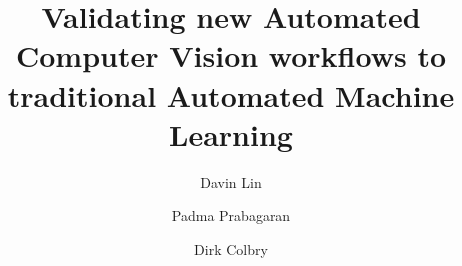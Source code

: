 \documentclass[acmsmall,screen]{acmart}
\begin{document}
\title[Validating new AutoCV workflows to traditional AutoML]{Validating new Automated Computer Vision workflows to traditional Automated Machine Learning}

\author{Davin Lin}

\author{Padma Prabagaran}

\author{Dirk Colbry}


\renewcommand{\shortauthors}{Davin Lin, Padma Prabagaran, and Dirk Colbry}

\end{document}

